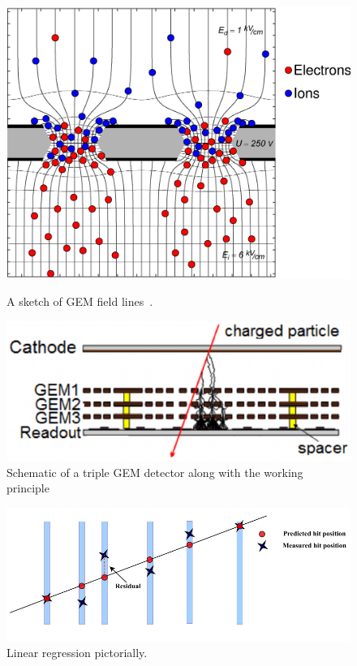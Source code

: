 \begin{figure}[t!]
\centering
  \begin{minipage}[t]{.45\textwidth}
    \centering
    \includegraphics[width=\linewidth]{thesis_figures/GEM_field.png}

    \caption{A sketch of GEM field lines~\cite{}.}
    \label{fig:GEM_field}
  \end{minipage}
  \hfill
  \begin{minipage}[t]{.45\textwidth}
    \centering
    \includegraphics[width=\linewidth]{thesis_figures/GEM_process.png}
    \caption{Schematic of a triple GEM detector along with the working principle~\cite{}}
    \label{fig:Triple_GEM}
  \end{minipage}
\end{figure}
\begin{figure}[t!]
\centering
\includegraphics[width=\textwidth]{thesis_figures/linear_reg_new.png}
\caption{Linear regression pictorially. }
\label{fig:linear_regression}
\end{figure}



